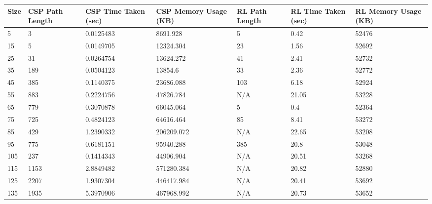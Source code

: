 \begin{tabular}{|l||l|l|l||l|l|l|}
\hline
Size & CSP Path Length & CSP Time Taken (sec) & CSP Memory Usage (KB) & RL Path Length & RL
Time Taken (sec) & RL Memory Usage (KB) \\ 
\hline \hline
5    & 3               & 0.0125483      & 8691.928         & 5              & 0.42          & 52476           \\ \hline
15   & 5               & 0.0149705      & 12324.304        & 23             & 1.56          & 52692           \\ \hline
25   & 31              & 0.0264754      & 13624.272        & 41             & 2.41          & 52732           \\ \hline
35   & 189             & 0.0504123      & 13854.6          & 33             & 2.36          & 52772           \\ \hline
45   & 385             & 0.1140375      & 23686.088        & 103            & 6.18          & 52924           \\ \hline
55   & 883             & 0.2224756      & 47826.784        & N/A            & 21.05         & 53228           \\ \hline
65   & 779             & 0.3070878      & 66045.064        & 5              & 0.4           & 52364           \\ \hline
75   & 725             & 0.4824123      & 64616.464        & 85             & 8.41          & 53272           \\ \hline
85   & 429             & 1.2390332      & 206209.072       & N/A            & 22.65         & 53208           \\ \hline
95   & 775             & 0.6181151      & 95940.288        & 385            & 20.8          & 53048           \\ \hline
105  & 237             & 0.1414343      & 44906.904        & N/A            & 20.51         & 53268           \\ \hline
115  & 1153            & 2.8849482      & 571280.384       & N/A            & 20.82         & 52880           \\ \hline
125  & 2207            & 1.9307304      & 446417.984       & N/A            & 20.41         & 53692           \\ \hline
135  & 1935            & 5.3970906      & 467968.992       & N/A            & 20.73         & 53652           \\ \hline

\end{tabular}

